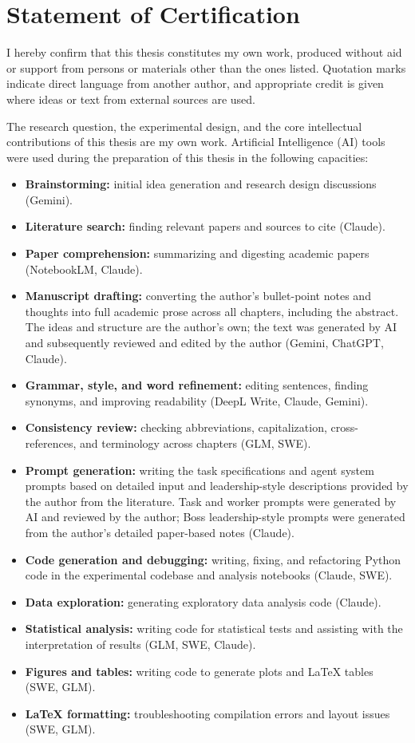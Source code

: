 \chapter{Statement of Certification}

I hereby confirm that this thesis constitutes my own work, produced without aid or support from persons or materials other than the ones listed. Quotation marks indicate direct language from another author, and appropriate credit is given where ideas or text from external sources are used.

The research question, the experimental design, and the core intellectual contributions of this thesis are my own work. Artificial Intelligence (AI) tools were used during the preparation of this thesis in the following capacities:

\begin{itemize}
    \item \textbf{Brainstorming:} initial idea generation and research design discussions (Gemini).
    \item \textbf{Literature search:} finding relevant papers and sources to cite (Claude).
    \item \textbf{Paper comprehension:} summarizing and digesting academic papers (NotebookLM, Claude).
    \item \textbf{Manuscript drafting:} converting the author's bullet-point notes and thoughts into full academic prose across all chapters, including the abstract. The ideas and structure are the author's own; the text was generated by AI and subsequently reviewed and edited by the author (Gemini, ChatGPT, Claude).
    \item \textbf{Grammar, style, and word refinement:} editing sentences, finding synonyms, and improving readability (DeepL Write, Claude, Gemini).
    \item \textbf{Consistency review:} checking abbreviations, capitalization, cross-references, and terminology across chapters (GLM, SWE).
    \item \textbf{Prompt generation:} writing the task specifications and agent system prompts based on detailed input and leadership-style descriptions provided by the author from the literature. Task and worker prompts were generated by AI and reviewed by the author; Boss leadership-style prompts were generated from the author's detailed paper-based notes (Claude).
    \item \textbf{Code generation and debugging:} writing, fixing, and refactoring Python code in the experimental codebase and analysis notebooks (Claude, SWE).
    \item \textbf{Data exploration:} generating exploratory data analysis code (Claude).
    \item \textbf{Statistical analysis:} writing code for statistical tests and assisting with the interpretation of results (GLM, SWE, Claude).
    \item \textbf{Figures and tables:} writing code to generate plots and \LaTeX{} tables (SWE, GLM).
    \item \textbf{\LaTeX{} formatting:} troubleshooting compilation errors and layout issues (SWE, GLM).
\end{itemize}

